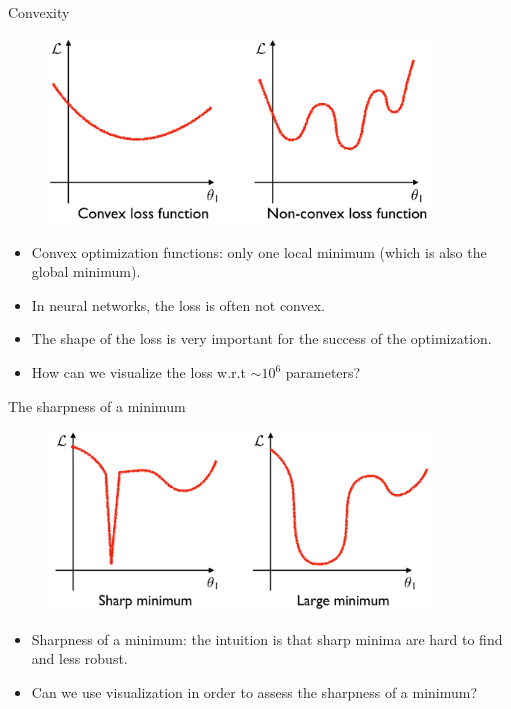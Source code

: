 \documentclass[xcolor=pdftex,dvipsnames,table]{beamer}
\begin{document}
\begin{frame}{Convexity}
\begin{figure}[htb]
\includegraphics[width=0.9\textwidth]{../graphics/Vis_convexity.png}
\end{figure}
\begin{itemize}
	\item Convex optimization functions: only one local minimum (which is also the global minimum). 
	\item In neural networks, the loss is often not convex. 
	\item The shape of the loss is very important for the success of the optimization. 
	\item How can we visualize the loss w.r.t $\sim10^6$ parameters? 
\end{itemize}
\end{frame}

\begin{frame}{The sharpness of a minimum}
\begin{figure}[htb]
\includegraphics[width=0.9\textwidth]{../graphics/Vis_sharpness.png}
\end{figure}
\begin{itemize}
	\item Sharpness of a minimum: the intuition is that sharp minima are hard to find and less robust. 
	\item Can we use visualization in order to assess the sharpness of a minimum? 
\end{itemize}
\end{frame}
\end{document}

